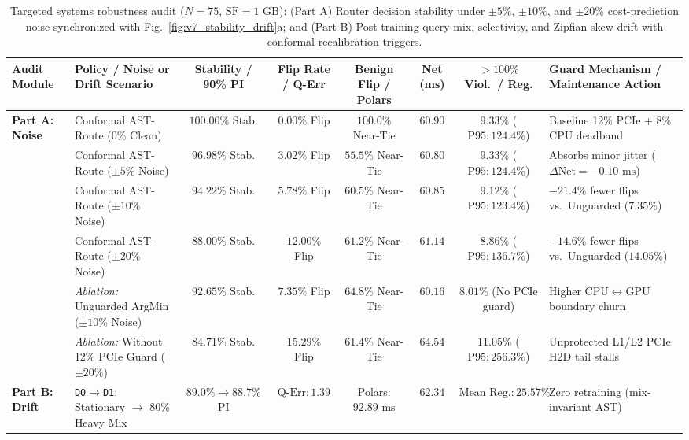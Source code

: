 \documentclass[10pt,a4paper]{article}
\newenvironment{fitasttable}{%
  \begin{lrbox}{\asttblbox}%
}{%
  \end{lrbox}%
  \sbox{\asttblboxB}{%
    \ifdim\wd\asttblbox>0.96\textwidth
      \resizebox{0.96\textwidth}{!}{\usebox{\asttblbox}}%
    \else
      \usebox{\asttblbox}%
    \fi
  }%
  \ifdim\ht\asttblboxB>0.72\textheight
    \resizebox{!}{0.72\textheight}{\usebox{\asttblboxB}}%
  \else
    \usebox{\asttblboxB}%
  \fi
}
\begin{document}
\begin{table}[!htbp]
\centering
\caption{Targeted systems robustness audit ($N=75$, $\text{SF}=1\text{ GB}$): (Part A) Router decision stability under $\pm 5\%$, $\pm 10\%$, and $\pm 20\%$ cost-prediction noise synchronized with Fig.~\ref{fig:v7_stability_drift}a; and (Part B) Post-training query-mix, selectivity, and Zipfian skew drift with conformal recalibration triggers.}\label{tab:v7_stability_drift}\label{tab:jbd_stability_t16}
\setlength{\tabcolsep}{2.8pt}
\scriptsize
\begin{fitasttable}
\begin{tabular}{@{}llcccccl@{}}
\toprule
\textbf{Audit Module} & \textbf{Policy / Noise or Drift Scenario} & \textbf{Stability / 90\% PI} & \textbf{Flip Rate / Q-Err} & \textbf{Benign Flip / Polars} & \textbf{Net (ms)} & \textbf{$>100\%$ Viol.\ / Reg.} & \textbf{Guard Mechanism / Maintenance Action} \\
\midrule
\multirow{6}{*}{\textbf{Part A: Noise}}
 & Conformal AST-Route ($0\%$ Clean) & $100.00\%$ Stab. & $0.00\%$ Flip & $100.0\%$ Near-Tie & $60.90$ & $9.33\%$ ($\text{P95}: 124.4\%$) & Baseline 12\% PCIe + 8\% CPU deadband \\
 & Conformal AST-Route ($\pm 5\%$ Noise) & $96.98\%$ Stab. & $3.02\%$ Flip & $55.5\%$ Near-Tie & $60.80$ & $9.33\%$ ($\text{P95}: 124.4\%$) & Absorbs minor jitter ($\Delta\text{Net} = -0.10\text{ ms}$) \\
 & Conformal AST-Route ($\pm 10\%$ Noise) & $\mathbf{94.22\%}$ Stab. & $\mathbf{5.78\%}$ Flip & $60.5\%$ Near-Tie & $60.85$ & $9.12\%$ ($\text{P95}: 123.4\%$) & $\mathbf{-21.4\%}$ fewer flips vs.\ Unguarded ($7.35\%$) \\
 & Conformal AST-Route ($\pm 20\%$ Noise) & $\mathbf{88.00\%}$ Stab. & $\mathbf{12.00\%}$ Flip & $61.2\%$ Near-Tie & $61.14$ & $\mathbf{8.86\%}$ ($\text{P95}: 136.7\%$) & $\mathbf{-14.6\%}$ fewer flips vs.\ Unguarded ($14.05\%$) \\
 & \emph{Ablation:} Unguarded ArgMin ($\pm 10\%$ Noise) & $92.65\%$ Stab. & $7.35\%$ Flip & $64.8\%$ Near-Tie & $60.16$ & $8.01\%$ (No PCIe guard) & Higher CPU$\leftrightarrow$GPU boundary churn \\
 & \emph{Ablation:} Without 12\% PCIe Guard ($\pm 20\%$) & $84.71\%$ Stab. & $15.29\%$ Flip & $61.4\%$ Near-Tie & $64.54$ & $11.05\%$ ($\text{P95}: 256.3\%$) & Unprotected L1/L2 PCIe H2D tail stalls \\
\midrule
\multirow{5}{*}{\textbf{Part B: Drift}}
 & \texttt{D0$\rightarrow$D1}: Stationary $\rightarrow$ $80\%$ Heavy Mix & $89.0\% \rightarrow 88.7\%$ PI & $\text{Q-Err}: 1.39$ & Polars: $92.89\text{ ms}$ & $\mathbf{62.34}$ & $\text{Mean Reg.}: 25.57\%$ & Zero retraining (mix-invariant AST) \\

\end{tabular}
\end{fitasttable}
\end{table}
\end{document}
